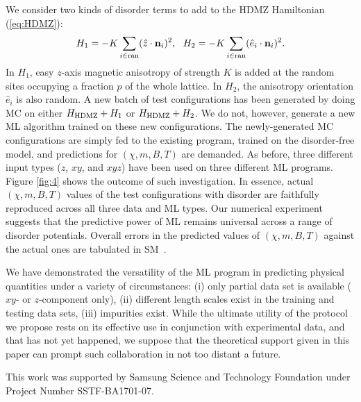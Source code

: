 \documentclass[reprint,amsmath,amssymb,aps,showpacs,superscriptaddress,prl]{revtex4-1}
\newcommand{\ba}{\begin{eqnarray}}
\newcommand{\ea}{\end{eqnarray}}
\renewcommand{\v}[1]{{\bf #1}}
\begin{document}
We consider two kinds of disorder terms to add to the HDMZ Hamiltonian (\ref{eq:HDMZ}):
%
\ba H_{1} = -K \sum_{i \in {\rm ran}} (\hat{z} \cdot \v n_i )^2 , ~~ H_2 = - K \sum_{i \in {\rm ran}} (\hat{e}_i \cdot \v n_i )^2 .  \ea
%
In $H_1$, easy $z$-axis magnetic anisotropy of strength $K$ is added at the random sites occupying a fraction $p$ of the whole lattice. In $H_2$, the anisotropy orientation $\hat{e}_i$ is also random. A new batch of test configurations has been generated by doing MC on either  $H_{\rm HDMZ} + H_1$ or $H_{\rm HDMZ} + H_2$. We do not, however, generate a new ML algorithm trained on these new configurations. The newly-generated MC configurations are simply fed to the existing program, trained on the disorder-free model, and predictions for $(\chi, m, B, T)$ are demanded. As before, three different input types ($z$, $xy$, and $xyz$) have been used on three different ML programs. Figure \ref{fig:4} shows the outcome of such investigation. In essence, actual $(\chi, m, B, T)$ values of the test configurations with disorder are faithfully reproduced across all three data and ML types. Our numerical experiment suggests that the predictive power of ML remains universal across a range of disorder potentials. Overall errors in the predicted values of $(\chi, m, B, T)$ against the actual ones are tabulated in SM~\cite{SM}. 

We have demonstrated the versatility of the ML program in predicting physical quantities under a variety of circumstances: (i) only partial data set is available ($xy$- or $z$-component only), (ii) different length scales exist in the training and testing data sets, (iii) impurities exist. While the ultimate utility of the protocol we propose rests on its effective use in conjunction with experimental data, and that has not yet happened, we suppose that the theoretical support given in this paper can prompt such collaboration in not too distant a future. 

This work was supported by Samsung Science and Technology Foundation under Project Number SSTF-BA1701-07.
\end{document}
